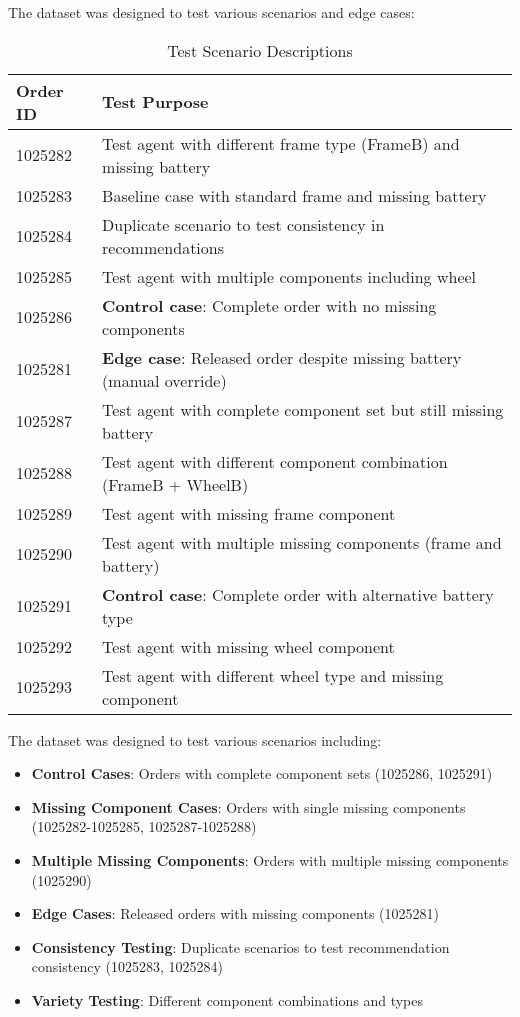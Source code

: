 The dataset was designed to test various scenarios and edge cases:

\begin{table}[h]
\centering
\caption{Test Scenario Descriptions}
\label{tab:test-scenarios}
\begin{tabular}{@{}ll@{}}
\toprule
\textbf{Order ID} & \textbf{Test Purpose} \\
\midrule
1025282 & Test agent with different frame type (FrameB) and missing battery \\
1025283 & Baseline case with standard frame and missing battery \\
1025284 & Duplicate scenario to test consistency in recommendations \\
1025285 & Test agent with multiple components including wheel \\
1025286 & \textbf{Control case}: Complete order with no missing components \\
1025281 & \textbf{Edge case}: Released order despite missing battery (manual override) \\
1025287 & Test agent with complete component set but still missing battery \\
1025288 & Test agent with different component combination (FrameB + WheelB) \\
1025289 & Test agent with missing frame component \\
1025290 & Test agent with multiple missing components (frame and battery) \\
1025291 & \textbf{Control case}: Complete order with alternative battery type \\
1025292 & Test agent with missing wheel component \\
1025293 & Test agent with different wheel type and missing component \\
\bottomrule
\end{tabular}
\end{table}

The dataset was designed to test various scenarios including:
\begin{itemize}
    \item \textbf{Control Cases}: Orders with complete component sets (1025286, 1025291)
    \item \textbf{Missing Component Cases}: Orders with single missing components (1025282-1025285, 1025287-1025288)
    \item \textbf{Multiple Missing Components}: Orders with multiple missing components (1025290)
    \item \textbf{Edge Cases}: Released orders with missing components (1025281)
    \item \textbf{Consistency Testing}: Duplicate scenarios to test recommendation consistency (1025283, 1025284)
    \item \textbf{Variety Testing}: Different component combinations and types
\end{itemize}

